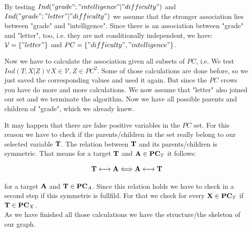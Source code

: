 			 \label{img.firstSelected}

			By testing $Ind("grade"; "intelligence" | "difficulty")$ and $Ind("grade"; "letter" | "difficulty")$ we assume that the stronger association lies between "grade" and "intelligence". Since there is an association between "grade" and "letter", too, i.e. they are not conditionally independent, we have: $\mathcal{V} = \{"letter"\}$ and $PC = \{"difficulty", "intelligence"\}$.

			 \label{img.secondSelected}

			Now we have to calculate the association given all subsets of $PC$, i.e. We test $Ind(T; X | Z) \forall X \in \mathcal{V}, Z \in PC^{2}$. Some of those calculations are done before, so we just saved the corresponding values and used it again. But since the $PC$ crows you have do more and more calculations. We now assume that "letter" also joined our set and we terminate the algorithm. Now we have all possible parents and children of "grade", which we already knew.

			 \label{img.thirdSelected}

			It may happen that there are false positive variables in the $PC$ set. For this reason we have to check if the parents/children in the set really belong to our selected variable ${\textbf{T}}$. The relation between ${\textbf{T}}$ and its parents/children is symmetric. That means for a target ${\textbf{T}}$ and ${\textbf{A}} \in {\textbf{PC}}_{T}$ it follows:

			\begin{equation}
				{\textbf{T}} \longleftrightarrow {\textbf{A}} \Longleftrightarrow {\textbf{A}} \longleftrightarrow {\textbf{T}} \label{eq.symmetric}
			\end{equation}

			for a target ${\textbf{A}}$ and ${\textbf{T}} \in {\textbf{PC}}_{A}$. Since this relation holds we have to check in a second step if this symmetrie is fullfild. For that we check for every ${\textbf{X}} \in {\textbf{PC}}_{T}$ if ${\textbf{T}} \in {\textbf{PC}}_{X}$.\\

			As we have finished all those calculations we have the structure/the skeleton of our graph.
			
